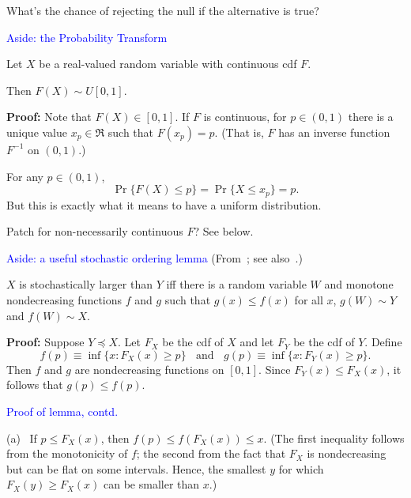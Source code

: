 \documentclass[landscape]{slides}
\newcommand{\beq}{\begin{equation}}
\newcommand{\eeq}{\end{equation}}
\begin{document}
\begin{slide}
\begin{slide}
 What's the chance of rejecting the null if the alternative is true?
 
 
\end{slide}

\begin{slide}
{\textcolor{blue}{Aside: the Probability Transform}}

Let $X$ be a real-valued random variable with continuous cdf $F$.

Then $F(X) \sim U[0, 1]$.

{\bf Proof:}
Note that $F(X) \in [0, 1]$.
If $F$ is continuous, for $p \in (0, 1)$
there is a unique value $x_p \in \Re$ such that
$F(x_p) = p$.  
(That is, $F$ has an inverse function $F^{-1}$
on $(0, 1)$.)

For any $p \in (0, 1)$,
\beq
   \Pr \{ F(X) \le p \} = \Pr \{ X \le x_p \} = p.
\eeq
But this is exactly what it means to have a uniform distribution.
   
Patch for non-necessarily continuous $F$?  See below.
 
 
\end{slide}


\begin{slide}
{\textcolor{blue}{Aside: a useful stochastic ordering lemma}}
(From~\cite{good10}; see also~\cite{LehmannRomano05}.)

$X$ is stochastically larger than $Y$ iff there is a random variable
$W$ and monotone nondecreasing functions $f$ and $g$ such that
$g(x) \le f(x)$ for all $x$, $g(W) \sim Y$ and $f(W) \sim X$.

{\bf Proof:}
Suppose $Y \preceq X$.
Let $F_X$ be the cdf of $X$ and let $F_Y$ be the cdf of $Y$.
Define 
\beq
   f(p) \equiv \inf \{ x : F_X(x) \ge p \} \;\;\mbox{ and } \;\; g(p) \equiv \inf \{ x : F_Y(x) \ge p \}.
\eeq
Then $f$ and $g$ are nondecreasing functions on $[0, 1]$.
Since $F_Y(x) \le F_X(x)$, it follows that $g(p) \le f(p)$.

\end{slide}

\begin{slide}
{\textcolor{blue}{Proof of lemma, contd.}}

(a)~ If $p \le F_X(x)$, then $f(p) \le f(F_X(x)) \le x$.
(The first inequality follows from the monotonicity of $f$; the second 
from the fact that $F_X$ is nondecreasing but can be flat on some intervals.
Hence, the smallest $y$ for which $F_X(y) \ge F_X(x)$ can be smaller than $x$.)


\end{slide}
\end{slide}
\end{document}

